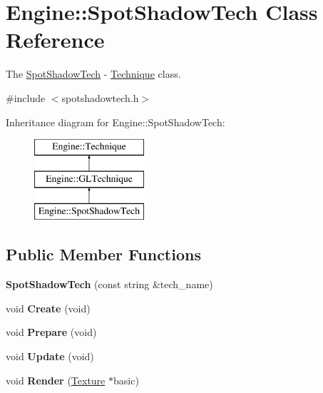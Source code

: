 \hypertarget{classEngine_1_1SpotShadowTech}{}\section{Engine\+:\+:Spot\+Shadow\+Tech Class Reference}
\label{classEngine_1_1SpotShadowTech}


The \hyperlink{classEngine_1_1SpotShadowTech}{Spot\+Shadow\+Tech} -\/ \hyperlink{classEngine_1_1Technique}{Technique} class.  




{\ttfamily \#include $<$spotshadowtech.\+h$>$}

Inheritance diagram for Engine\+:\+:Spot\+Shadow\+Tech\+:\begin{figure}[H]
\begin{center}
\leavevmode
\includegraphics[height=3.000000cm]{classEngine_1_1SpotShadowTech}
\end{center}
\end{figure}
\subsection*{Public Member Functions}
\begin{DoxyCompactItemize}
\item 
\hypertarget{classEngine_1_1SpotShadowTech_a676ba2fe72058da25e0a5d4a59621c69}{}{\bfseries Spot\+Shadow\+Tech} (const string \&tech\+\_\+name)\label{classEngine_1_1SpotShadowTech_a676ba2fe72058da25e0a5d4a59621c69}

\item 
\hypertarget{classEngine_1_1SpotShadowTech_a218573c045ca373ceb2838627aead830}{}void {\bfseries Create} (void)\label{classEngine_1_1SpotShadowTech_a218573c045ca373ceb2838627aead830}

\item 
\hypertarget{classEngine_1_1SpotShadowTech_ad1760e18c77e62b587b55b47e50dc1e0}{}void {\bfseries Prepare} (void)\label{classEngine_1_1SpotShadowTech_ad1760e18c77e62b587b55b47e50dc1e0}

\item 
\hypertarget{classEngine_1_1SpotShadowTech_abf807770f3567273be6097274d4d1b31}{}void {\bfseries Update} (void)\label{classEngine_1_1SpotShadowTech_abf807770f3567273be6097274d4d1b31}

\item 
\hypertarget{classEngine_1_1SpotShadowTech_a1b04d91fa4e5fdc98bbc41ec15b4f9e1}{}void {\bfseries Render} (\hyperlink{classEngine_1_1Texture}{Texture} $\ast$basic)\label{classEngine_1_1SpotShadowTech_a1b04d91fa4e5fdc98bbc41ec15b4f9e1}

\end{DoxyCompactItemize}
